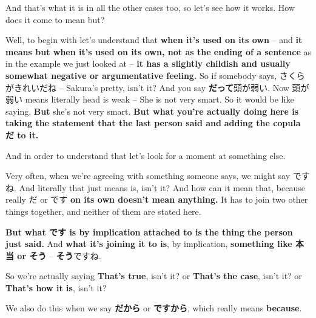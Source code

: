 {}

And that's what it is in all the other cases too, so let's see how it works. How does it come to mean but?

\stopsectionlevel

\startsectionlevel[title={だって as but},reference={だって-as-but}]

Well, to begin with let's understand that {\bf when it's used on its own} -- and {\bf it means but when it's used on its own, not as the ending of a sentence} as in the example we just looked at -- {\bf it has a slightly childish and usually somewhat negative or argumentative feeling.} So if somebody says, さくらがきれいだね -- Sakura's pretty, isn't it? And you say {\bf だって}頭が弱い. Now 頭が弱い means literally head is weak -- She is not very smart. So it would be like saying, {\bf But} she's not very smart. {\bf But what you're actually doing here is taking the statement that the last person said and} {\bf adding the copula だ to it.}

{}

And in order to understand that let's look for a moment at something else.

\startsectionlevel[title={ですね},reference={ですね}]

Very often, when we're agreeing with something someone says, we might say ですね. And literally that just means is, isn't it? And how can it mean that, because really だ or です {\bf on its own doesn't mean anything.} It has to join two other things together, and neither of them are stated here.

{}

{\bf But what です is by implication attached to is the thing the person just said.} And {\bf what it's joining it to is}, by implication, {\bf something like 本当 or そう} -- {\bf そう}ですね.

{}

So we're actually saying {\bf That's true}, isn't it? or {\bf That's the case}, isn't it? or {\bf That's how it is}, isn't it?

\stopsectionlevel

\stopsectionlevel

\startsectionlevel[title={それから & だから / ですから},reference={それから-だから-ですから}]

We also do this when we say {\bf だから} or {\bf ですから}, which really means {\bf because}.

